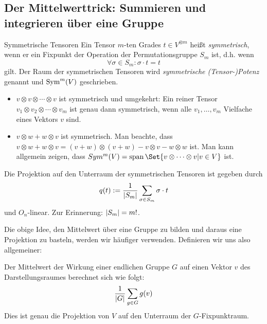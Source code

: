 \subsection{Der Mittelwerttrick: Summieren und integrieren über eine Gruppe}

\begin{definition}{Symmetrische Tensoren}
	\label{symmetrische_tensoren:def}
Ein Tensor $m$-ten Grades $t\in V^{\otimes m}$ heißt \emph{symmetrisch}, wenn er ein Fixpunkt der Operation der Permutationsgruppe $S_m$ ist, d.h. wenn
\[\forall \sigma\in S_m: \sigma\cdot t = t\]
gilt. Der Raum der symmetrischen Tensoren wird \emph{symmetrische (Tensor-)Potenz} genannt und $\operatorname{Sym}^m(V)$ geschrieben.
\end{definition}

\begin{example}
\begin{itemize}
\item $v\otimes v\otimes \cdots\otimes v$ ist symmetrisch und umgekehrt: Ein reiner Tensor $v_1\otimes v_2\otimes\cdots\otimes v_m$ ist genau dann symmetrisch, wenn alle $v_1,\ldots, v_m$ Vielfache eines Vektors $v$ sind.
\item $v\otimes w + w\otimes v$ ist symmetrisch. Man beachte, dass $v\otimes w + w\otimes v = (v+w)\otimes(v+w) - v\otimes v - w\otimes w$ ist. Man kann allgemein zeigen, dass $Sym^m(V) = \operatorname{span}\Set{v\otimes\cdots\otimes v | v\in V}$ ist.
\end{itemize}
\end{example}

\begin{lemma}[Mittelwerttrick]\label{symmetrische_tensoren:projektion}
Die Projektion auf den Unterraum der symmetrischen Tensoren ist gegeben durch
\[q(t) := \frac{1}{\lvert S_m\rvert} \sum_{\sigma\in S_m} \sigma\cdot t\]
und $O_n$-linear. Zur Erinnerung: $\lvert S_m\rvert = m!$.
\end{lemma}
Die obige Idee, den Mittelwert über eine Gruppe zu bilden und daraus eine Projektion zu basteln, werden wir häufiger verwenden. Definieren wir uns also allgemeiner:
\begin{definition}
	Der Mittelwert der Wirkung einer endlichen Gruppe $G$ auf einen Vektor $v$ des Darstellungsraumes berechnet sich wie folgt:
	\[
		\frac{1}{\lvert G\rvert} \sum_{g\in G} g(v)
	\]
	Dies ist genau die Projektion von $V$ auf den Unterraum der $G$-Fixpunktraum.
\end{definition}


